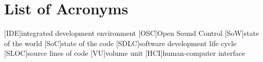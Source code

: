 
\chapter*{List of Acronyms}
\label{chap:acronyms}

\begin{acronym}[xxxxx]
[IDE]{integrated development environment}
[OSC]{Open Sound Control}
[SoW]{state of the world}
[SoC]{state of the code}
[SDLC]{software development life cycle}
[SLOC]{source lines of code}
[VU]{volume unit}
[HCI]{human-computer interface}
\end{acronym}